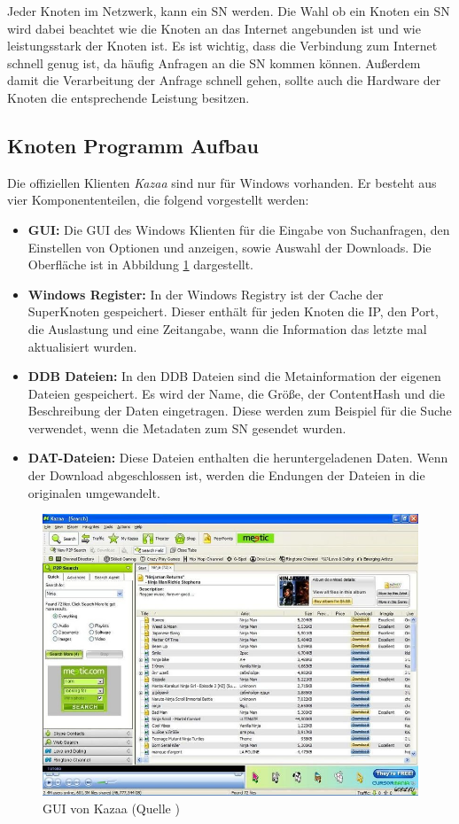 Jeder Knoten im Netzwerk, kann ein SN werden.
Die Wahl ob ein Knoten ein SN wird dabei beachtet wie die Knoten an  das Internet angebunden ist und wie leistungsstark der Knoten ist.
Es ist wichtig, dass die Verbindung zum Internet schnell genug ist, da häufig Anfragen an die SN kommen können.
Außerdem damit die Verarbeitung der Anfrage schnell gehen, sollte auch die Hardware der Knoten die entsprechende Leistung besitzen.

\subsection{Knoten Programm Aufbau}
\label{subsec:proAuf}

Die offiziellen Klienten \textit{Kazaa}\cite{kazaa} sind nur für Windows vorhanden.
Er besteht aus vier Komponententeilen, die folgend vorgestellt werden:

\begin{itemize}
\item[1.] \textbf{GUI:} Die GUI des Windows Klienten für die Eingabe von Suchanfragen, den Einstellen von Optionen und anzeigen, sowie Auswahl der Downloads.
Die Oberfläche ist in Abbildung \ref{fig:kazgui} dargestellt.
\item[2.] \textbf{Windows Register:} In der Windows Registry ist der Cache der SuperKnoten gespeichert.
Dieser enthält für jeden Knoten die IP, den Port, die Auslastung und eine Zeitangabe, wann die Information das letzte mal aktualisiert wurden.
\item[3.] \textbf{DDB Dateien:} In den DDB Dateien sind die Metainformation der eigenen Dateien gespeichert.
Es wird der Name, die Größe, der ContentHash und die Beschreibung der Daten eingetragen.
Diese werden zum Beispiel für die Suche verwendet, wenn die Metadaten zum SN gesendet wurden.
\item[4.] \textbf{DAT-Dateien:} Diese Dateien enthalten die heruntergeladenen Daten.
Wenn der Download abgeschlossen ist, werden die Endungen der Dateien in die originalen umgewandelt.
\end{itemize}

\begin{figure}
\includegraphics[scale=0.3]{gfx/Kazaa-search-big}
\caption{GUI von Kazaa (Quelle \cite{kazaagui})}
\label{fig:kazgui}
\end{figure}

